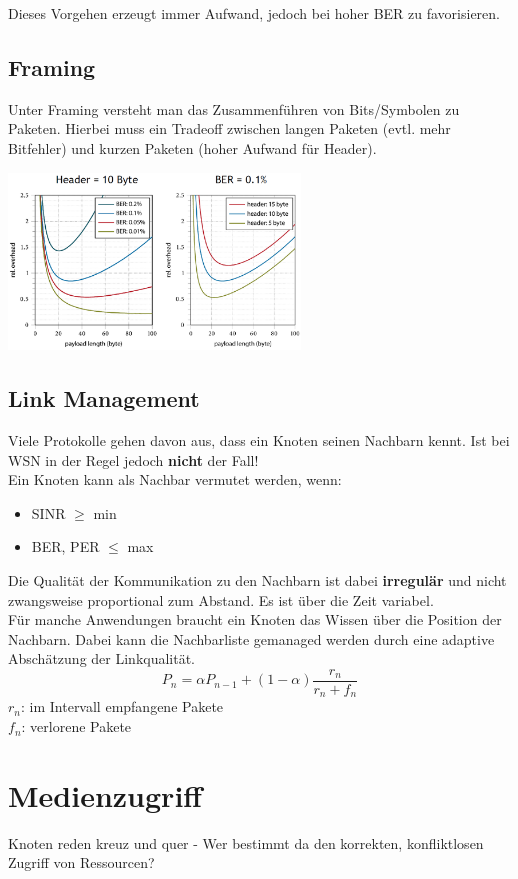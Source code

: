 \documentclass[a4paper]{article}
\begin{document}
Dieses Vorgehen erzeugt immer Aufwand, jedoch bei hoher BER zu favorisieren.

\subsection{Framing}
Unter Framing versteht man das Zusammenführen von Bits/Symbolen zu Paketen. Hierbei muss ein Tradeoff zwischen langen Paketen (evtl. mehr Bitfehler) und kurzen Paketen (hoher Aufwand für Header).
\begin{center}
	\includegraphics[height = 4.7cm]{Packetsize.png}
\end{center}
\subsection{Link Management}
Viele Protokolle gehen davon aus, dass ein Knoten seinen Nachbarn kennt. Ist bei WSN in der Regel jedoch \textbf{nicht} der Fall!\\
Ein Knoten kann als Nachbar vermutet werden, wenn:
\begin{itemize}
	\item SINR $\geq$ min
	\item BER, PER $\leq$ max
\end{itemize}
Die Qualität der Kommunikation zu den Nachbarn ist dabei \textbf{irregulär} und nicht zwangsweise proportional zum Abstand. Es ist über die Zeit variabel.\\

Für manche Anwendungen braucht ein Knoten das Wissen über die Position der Nachbarn. Dabei kann die Nachbarliste gemanaged werden durch eine adaptive Abschätzung der Linkqualität.
$$P_n = \alpha P_{n-1} + (1-\alpha)\frac{r_n}{r_n+f_n}$$
$r_n$: im Intervall empfangene Pakete\\
$f_n$: verlorene Pakete

\newpage
\section{Medienzugriff}
Knoten reden kreuz und quer - Wer bestimmt da den korrekten, konfliktlosen Zugriff von Ressourcen?\\
\end{document}
